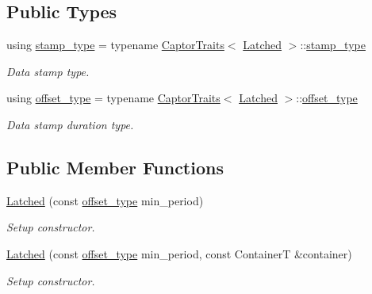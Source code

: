\subsection*{Public Types}
\begin{DoxyCompactItemize}
\item 
\mbox{\label{classflow_1_1follower_1_1_latched_aa54d0ea59daabcdd06a6a1ff7681fe6d}} 
using \hyperlink{classflow_1_1follower_1_1_latched_aa54d0ea59daabcdd06a6a1ff7681fe6d}{stamp\+\_\+type} = typename \hyperlink{structflow_1_1_captor_traits}{Captor\+Traits}$<$ \hyperlink{classflow_1_1follower_1_1_latched}{Latched} $>$\+::\hyperlink{classflow_1_1follower_1_1_latched_aa54d0ea59daabcdd06a6a1ff7681fe6d}{stamp\+\_\+type}
\begin{DoxyCompactList}\small\item\em Data stamp type. \end{DoxyCompactList}\item 
\mbox{\label{classflow_1_1follower_1_1_latched_ae30442baa432fd3784ecc5199ddcfeb2}} 
using \hyperlink{classflow_1_1follower_1_1_latched_ae30442baa432fd3784ecc5199ddcfeb2}{offset\+\_\+type} = typename \hyperlink{structflow_1_1_captor_traits}{Captor\+Traits}$<$ \hyperlink{classflow_1_1follower_1_1_latched}{Latched} $>$\+::\hyperlink{classflow_1_1follower_1_1_latched_ae30442baa432fd3784ecc5199ddcfeb2}{offset\+\_\+type}
\begin{DoxyCompactList}\small\item\em Data stamp duration type. \end{DoxyCompactList}\end{DoxyCompactItemize}
\subsection*{Public Member Functions}
\begin{DoxyCompactItemize}
\item 
\hyperlink{classflow_1_1follower_1_1_latched_ac2744bb4d4e1f91474d7d801cb3f716d}{Latched} (const \hyperlink{classflow_1_1follower_1_1_latched_ae30442baa432fd3784ecc5199ddcfeb2}{offset\+\_\+type} min\+\_\+period)
\begin{DoxyCompactList}\small\item\em Setup constructor. \end{DoxyCompactList}\item 
\hyperlink{classflow_1_1follower_1_1_latched_a8b4fb76009a6cead726789c79a2eb2fa}{Latched} (const \hyperlink{classflow_1_1follower_1_1_latched_ae30442baa432fd3784ecc5199ddcfeb2}{offset\+\_\+type} min\+\_\+period, const ContainerT \&container)
\begin{DoxyCompactList}\small\item\em Setup constructor. \end{DoxyCompactList}\end{DoxyCompactItemize}
